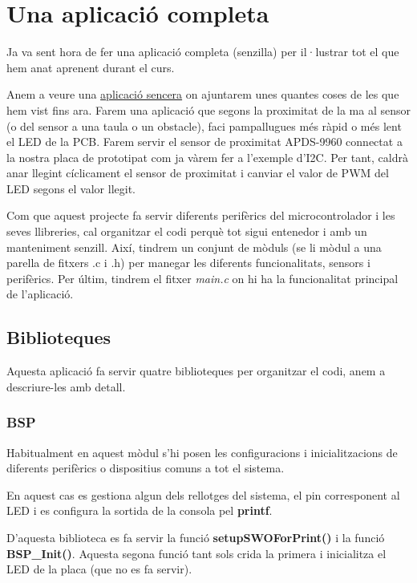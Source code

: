\chapter{Una aplicació completa}
\label{ch:aplicaciosenzilla}
Ja va sent hora de fer una aplicació completa (senzilla) per il·lustrar tot el que hem anat aprenent durant el curs.

Anem a veure una \href{https://github.com/mariusmm/cursembedded/tree/master/Simplicity/Barebone_App_1}{aplicació sencera} on ajuntarem unes quantes coses de les que hem vist fins ara. Farem una aplicació que segons la proximitat de la ma al sensor (o del sensor a una taula o un obstacle), faci pampallugues més ràpid o més lent el LED de la PCB. Farem servir el sensor de proximitat APDS-9960 connectat a la nostra placa de prototipat com ja vàrem fer a l'exemple d'I2C. Per tant, caldrà anar llegint cíclicament el sensor de proximitat i canviar el valor de \gls{PWM} del LED segons el valor llegit.

Com que aquest projecte fa servir diferents perifèrics del microcontrolador i les seves llibreries, cal organitzar el codi perquè tot sigui entenedor i amb un manteniment senzill. Així, tindrem un conjunt de mòduls (se li mòdul a una parella de fitxers .c i .h) per manegar les diferents funcionalitats, sensors i perifèrics. Per últim, tindrem el fitxer {\em main.c} on hi ha la funcionalitat principal de l'aplicació.

\section{Biblioteques}
Aquesta aplicació fa servir quatre biblioteques per organitzar el codi, anem a descriure-les amb detall.

\subsection{BSP}
Habitualment en aquest mòdul s'hi posen les configuracions i inicialitzacions de diferents perifèrics o dispositius comuns a tot el sistema.

En aquest cas es gestiona algun dels rellotges del sistema, el pin corresponent al LED i es configura la sortida de la consola pel {\bf printf}.

D'aquesta biblioteca es fa servir la funció {\bf setupSWOForPrint()} i la funció {\bf BSP\_Init()}. Aquesta segona funció tant sols crida la primera i inicialitza el LED de la placa (que no es fa servir).

